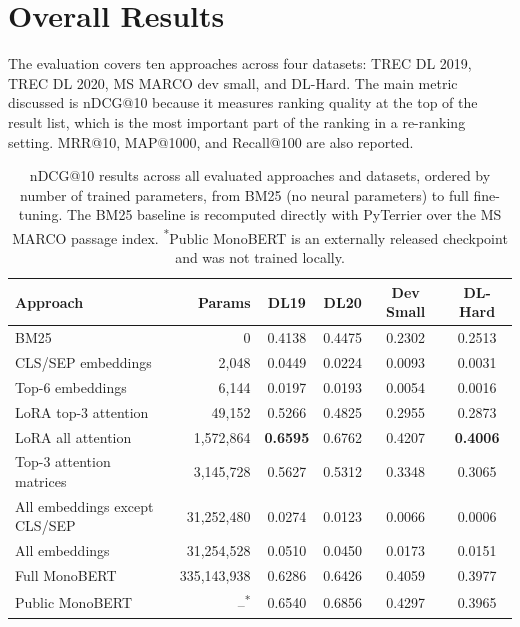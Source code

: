 \FloatBarrier

\section{Overall Results}
\label{sec:results_overview}

The evaluation covers ten approaches across four datasets: TREC DL 2019, TREC DL 2020, MS MARCO dev small, and DL-Hard. The main metric discussed is nDCG@10 because it measures ranking quality at the top of the result list, which is the most important part of the ranking in a re-ranking setting. MRR@10, MAP@1000, and Recall@100 are also reported.

\begin{table}[ht]
\centering
\small
\begin{tabular}{lrcccc}
\hline
\textbf{Approach} & \textbf{Params} & \textbf{DL19} & \textbf{DL20} & \textbf{Dev Small} & \textbf{DL-Hard} \\
\hline
BM25 & 0 & 0.4138 & 0.4475 & 0.2302 & 0.2513 \\
CLS/SEP embeddings & 2,048 & 0.0449 & 0.0224 & 0.0093 & 0.0031 \\
Top-6 embeddings & 6,144 & 0.0197 & 0.0193 & 0.0054 & 0.0016 \\
LoRA top-3 attention & 49,152 & 0.5266 & 0.4825 & 0.2955 & 0.2873 \\
LoRA all attention & 1,572,864 & \textbf{0.6595} & 0.6762 & 0.4207 & \textbf{0.4006} \\
Top-3 attention matrices & 3,145,728 & 0.5627 & 0.5312 & 0.3348 & 0.3065 \\
All embeddings except CLS/SEP & 31,252,480 & 0.0274 & 0.0123 & 0.0066 & 0.0006 \\
All embeddings & 31,254,528 & 0.0510 & 0.0450 & 0.0173 & 0.0151 \\
Full MonoBERT & 335,143,938 & 0.6286 & 0.6426 & 0.4059 & 0.3977 \\
Public MonoBERT & --\textsuperscript{*} & 0.6540 & 0.6856 & 0.4297 & 0.3965 \\
\hline
\end{tabular}
\caption{nDCG@10 results across all evaluated approaches and datasets, ordered by number of trained parameters, from BM25 (no neural parameters) to full fine-tuning. The BM25 baseline is recomputed directly with PyTerrier over the MS MARCO passage index. \textsuperscript{*}Public MonoBERT is an externally released checkpoint and was not trained locally.}
\label{tab:results_nDCG}
\end{table}


